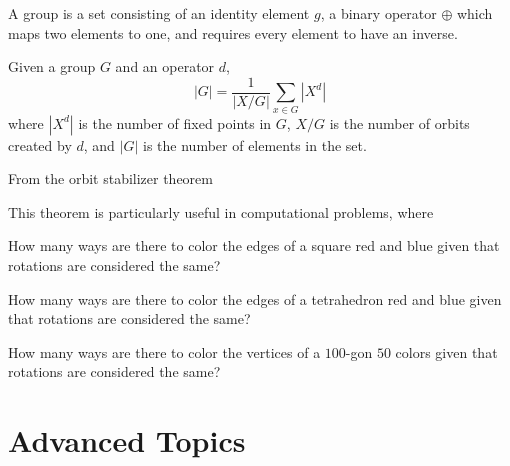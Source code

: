 \documentclass[11pt]{scrartcl}
\theoremstyle{plain} %
\theoremstyle{definition}
\theoremstyle{remark}
\theoremstyle{empty}
\theoremstyle{empty}
\theoremstyle{empty}
\theoremstyle{empty}
\theoremstyle{empty}
\theoremstyle{empty}
\begin{document}
\begin{definition}[Group]
A group is a set consisting of an identity element $g$, a binary operator $\oplus$ which maps two elements to one, and requires every element to have an inverse.
\end{definition}

\begin{definition}

\end{definition}

\begin{definition}[Stabilizer]

\end{definition}

\begin{definition}[Orbit]

\end{definition}



\begin{theorem}
Given a group $G$ and an operator $d$, \[|G| = \frac{1}{|X/G|} \sum_{x\in G} |X^d|\] where $|X^d|$ is the number of fixed points in $G$, $X/G$ is the number of orbits created by $d$, and $|G|$ is the number of elements in the set.
\end{theorem}

\proof From the orbit stabilizer theorem 

This theorem is particularly useful in computational problems, where 

\begin{problem}[Classic]
How many ways are there to color the edges of a square red and blue given that rotations are considered the same?
\end{problem}

\begin{problem}[Classic]
How many ways are there to color the edges of a tetrahedron red and blue given that rotations are considered the same?
\end{problem}

\begin{problem}[Own]
How many ways are there to color the vertices of a $100$-gon $50$ colors given that rotations are considered the same?
\end{problem}

\section{Advanced Topics}
\end{document}

